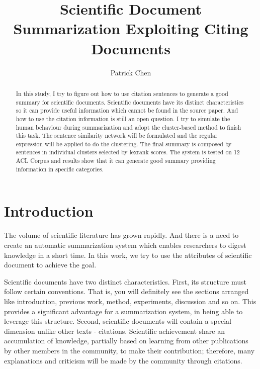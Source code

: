 \documentclass[hyp]{socreport}
\begin{document}
\title{Scientific Document Summarization Exploiting Citing Documents}
\author{Patrick Chen}
\maketitle

\begin{abstract}
In this study, I try to figure out how to use citation sentences to generate a good summary for scientific documents. Scientific documents have its distinct characteristics so it can provide useful information which cannot be found in the source paper. And how to use the citation information is still an open question.  I try to simulate the human behaviour during  summarization and adopt the cluster-based method to finish this task. The sentence similarity network will be formulated and the regular expression will be applied to do the clustering. The final summary is composed by sentences in individual clusters selected by lexrank scores. The system is tested on 12 ACL Corpus and results show that it can generate good summary providing information in specific categories.
\end{abstract}

\section{Introduction}

The volume of scientific literature has grown rapidly. And there is a need to create an automatic summarization system which enables researchers to digest knowledge in a short time. In this work, we try to use the attributes of scientific document to achieve the goal.

Scientific documents have two distinct characteristics. First, its structure must follow certain conventions. That is, you will definitely see the sections arranged like introduction, previous work, method, experiments, discussion and so on. This provides a significant advantage for a summarization system, in being able to leverage this structure. Second, scientific documents will contain a special dimension unlike other texts - citations. Scientific achievement share an accumulation of knowledge, partially based on learning from other publications by other members in the community, to make their contribution; therefore, many explanations and criticism will be made by the community through citations.  
\end{document}
